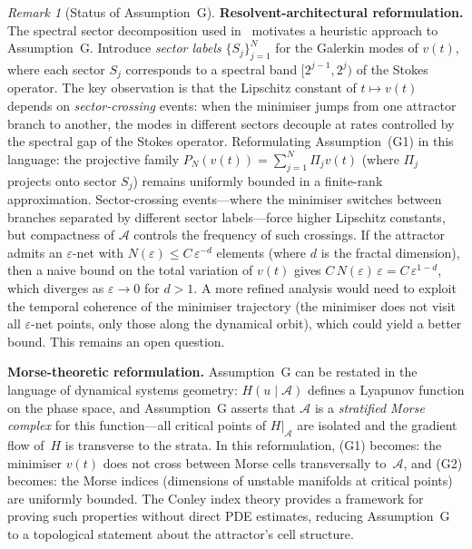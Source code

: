 \documentclass[12pt,a4paper]{article}
\theoremstyle{definition}
\theoremstyle{plain}
\theoremstyle{remark}
\newtheorem{remark}[definition]{Remark}
\begin{document}
\begin{remark}[Status of Assumption~G]
\medskip\noindent
\textbf{Resolvent-architectural reformulation.}\;
The spectral sector decomposition used in~\cite{GeigerRH2026c}
motivates a heuristic approach to Assumption~G. Introduce \emph{sector labels}
$\{S_j\}_{j=1}^{N}$ for the Galerkin modes of $v(t)$, where each sector
$S_j$ corresponds to a spectral band $[2^{j-1}, 2^j)$ of the Stokes
operator. The key observation is that the Lipschitz constant of
$t \mapsto v(t)$ depends on \emph{sector-crossing} events: when the
minimiser jumps from one attractor branch to another, the modes in
different sectors decouple at rates controlled by the spectral gap of
the Stokes operator. Reformulating Assumption~(G1) in this language:
the projective family $P_N(v(t)) = \sum_{j=1}^{N} \Pi_j v(t)$ (where
$\Pi_j$ projects onto sector $S_j$) remains uniformly bounded in a
finite-rank approximation. Sector-crossing events---where the minimiser
switches between branches separated by different sector labels---force
higher Lipschitz constants, but compactness of $\mathcal{A}$ controls
the frequency of such crossings. If the attractor admits an
$\varepsilon$-net with $N(\varepsilon) \leq C\,\varepsilon^{-d}$
elements (where $d$ is the fractal dimension), then a naive bound on
the total variation of $v(t)$ gives
$C\,N(\varepsilon)\,\varepsilon = C\,\varepsilon^{1-d}$, which
diverges as $\varepsilon \to 0$ for $d > 1$.  A more refined analysis
would need to exploit the temporal coherence of the minimiser trajectory
(the minimiser does not visit all $\varepsilon$-net points, only those
along the dynamical orbit), which could yield a better bound.
This remains an open question.

\medskip\noindent
\textbf{Morse-theoretic reformulation.}\;
Assumption~G can be restated in the language of dynamical systems
geometry: $H(u \mid \mathcal{A})$ defines a Lyapunov function on the
phase space, and Assumption~G asserts that $\mathcal{A}$ is a
\emph{stratified Morse complex} for this function---all critical
points of $H|_{\mathcal{A}}$ are isolated and the gradient flow of~$H$
is transverse to the strata. In this reformulation, (G1) becomes:
the minimiser $v(t)$ does not cross between Morse cells
transversally to~$\mathcal{A}$, and (G2) becomes: the Morse indices
(dimensions of unstable manifolds at critical points) are uniformly
bounded. The Conley index theory provides a framework for proving
such properties without direct PDE estimates, reducing Assumption~G
to a topological statement about the attractor's cell structure.


\end{remark}
\end{document}
